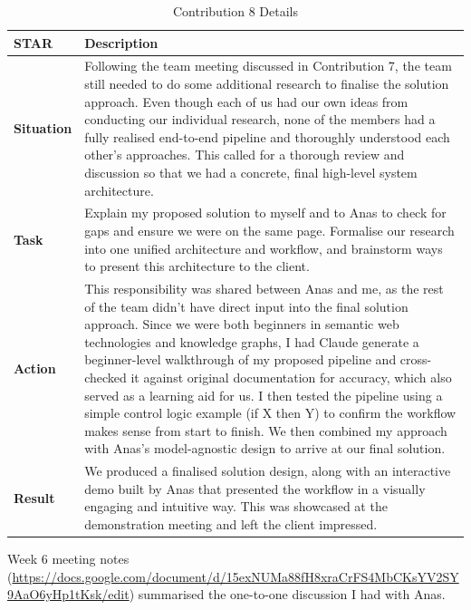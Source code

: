 \documentclass{article}
\begin{document}
    \begin{xltabular}{\textwidth}{p{2cm} X}
    \caption{Contribution 8 Details} \\
    \hline
    \textbf{STAR} & \textbf{Description} \\
    \hline
    \endfirsthead

    \hline
    \endlastfoot

    \textbf{Situation} & Following the team meeting discussed in Contribution 7, the team still needed to do some additional research to finalise the solution approach. Even though each of us had our own ideas from conducting our individual research, none of the members had a fully realised end-to-end pipeline and thoroughly understood each other's approaches. This called for a thorough review and discussion so that we had a concrete, final high-level system architecture. \\

    \textbf{Task} & Explain my proposed solution to myself and to Anas to check for gaps and ensure we were on the same page. Formalise our research into one unified architecture and workflow, and brainstorm ways to present this architecture to the client. \\

    \textbf{Action} & This responsibility was shared between Anas and me, as the rest of the team didn't have direct input into the final solution approach. Since we were both beginners in semantic web technologies and knowledge graphs, I had Claude generate a beginner-level walkthrough of my proposed pipeline and cross-checked it against original documentation for accuracy, which also served as a learning aid for us. I then tested the pipeline using a simple control logic example (if X then Y) to confirm the workflow makes sense from start to finish. We then combined my approach with Anas's model-agnostic design to arrive at our final solution. \\

    \textbf{Result} & We produced a finalised solution design, along with an interactive demo built by Anas that presented the workflow in a visually engaging and intuitive way. This was showcased at the demonstration meeting and left the client impressed. \\

    \end{xltabular}

    Week 6 meeting notes (\url{https://docs.google.com/document/d/15exNUMa88fH8xraCrFS4MbCKsYV2SY9AaO6yHp1tKsk/edit}) summarised the one-to-one discussion I had with Anas.
\end{document}
